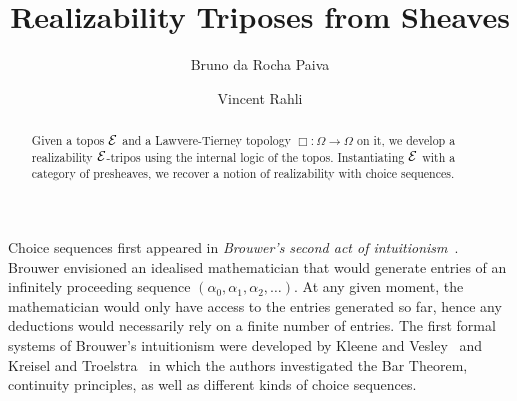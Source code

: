 \documentclass{easychair}
\title{Realizability Triposes from Sheaves}
\author{
 Bruno da Rocha Paiva%
\and
 Vincent Rahli%
}
\institute{
  University of Birmingham, United Kingdom
 }
\begin{document}
\maketitle

\begin{abstract}
  Given a topos \(\mathcal{E}\) and a Lawvere-Tierney topology
  \(\Box : \Omega \to \Omega\) on it, we develop a realizability \(\mathcal{E}\)-tripos
  using the internal logic of the topos.
  Instantiating \(\mathcal{E}\) with a category of presheaves, we recover a notion of
  realizability with choice sequences.
\end{abstract}



%
%



Choice sequences first appeared in \textit{Brouwer's second act of
  intuitionism}~\cite{vanattenBrouwer2004}.
%
Brouwer envisioned an idealised mathematician that would
generate entries of an infinitely proceeding sequence
\((\alpha_{0}, \alpha_{1}, \alpha_{2}, \dots)\).
%
At any given moment, the mathematician would only have access to the entries
generated so far, hence any deductions would necessarily rely on a finite number
of entries.
%
The first formal systems of Brouwer's intuitionism were developed by
Kleene and Vesley~\cite{kleeneFoundationsIntuitionisticMathematics1965}
and Kreisel and Troelstra~\cite{kreiselFormalSystemsBranches1970} in which
the authors investigated the Bar Theorem, continuity principles, as well
as different kinds of choice sequences.
\end{document}
